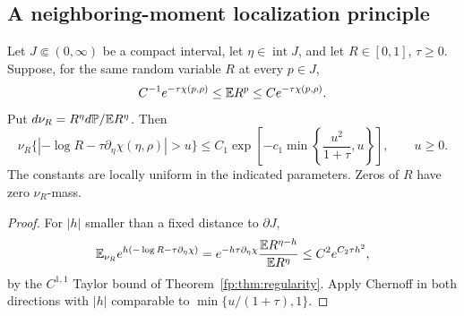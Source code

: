 \subsection{A neighboring-moment localization principle}
\begin{lemma}\label{fp:lem:localization}
Let $J\Subset(0,\infty)$ be a compact interval, let $\eta\in\operatorname{int}J$, and let $R\in[0,1]$, $\tau\ge0$. Suppose, for the same random variable $R$ at every $p\in J$,
\begin{equation}\label{fp:eq:moment-window}
 C^{-1}e^{-\tau\chi(p,\rho)}\le\mathbb E R^p\le Ce^{-\tau\chi(p,\rho)}.
\end{equation}
Put $d\nu_R=R^\eta d\mathbb P/\mathbb E R^\eta$. Then
\begin{equation}\label{fp:eq:bernstein}
 \nu_R\{|{-\log R}-\tau\partial_\eta\chi(\eta,\rho)|>u\}
 \le C_1\exp\left[-c_1\min\left\{\frac{u^2}{1+\tau},u\right\}\right],
 \qquad u\ge0.
\end{equation}
The constants are locally uniform in the indicated parameters. Zeros of $R$ have zero $\nu_R$-mass.
\end{lemma}
\begin{proof}
For $|h|$ smaller than a fixed distance to $\partial J$,
\[
 \mathbb E_{\nu_R}e^{h(-\log R-\tau\partial_\eta\chi)}
 =e^{-h\tau\partial_\eta\chi}\frac{\mathbb E R^{\eta-h}}{\mathbb E R^\eta}
 \le C^2e^{C_2\tau h^2},
\]
by the $C^{1,1}$ Taylor bound of Theorem~\ref{fp:thm:regularity}. Apply Chernoff in both directions with $|h|$ comparable to $\min\{u/(1+\tau),1\}$. 
\end{proof}

